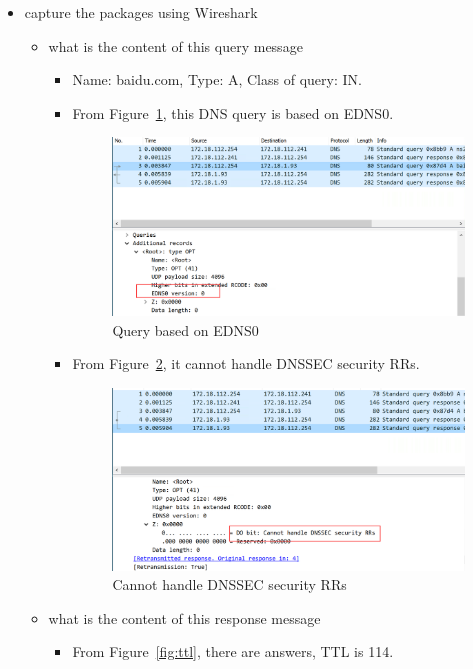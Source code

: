 \documentclass[12pt,letterpaper]{ctexart}
\begin{document}
\begin{itemize}
  \item capture the packages using Wireshark
  \begin{itemize}
    \item what is the content of this query message
    \begin{itemize}
      \item Name: baidu.com, Type: A, Class of query: IN.
      \item From Figure~\ref{fig:edns0}, this DNS query is based on EDNS0.
      \begin{figure}[H]
        \centering
        \includegraphics[width=0.8\linewidth]{assets/edns0.png}
        \caption{Query based on EDNS0}
        \label{fig:edns0}
      \end{figure}
      \item From Figure~\ref{fig:secure}, it cannot handle DNSSEC security RRs.
      \begin{figure}[H]
        \centering
        \includegraphics[width=0.8\linewidth]{assets/secure.png}
        \caption{Cannot handle DNSSEC security RRs}
        \label{fig:secure}
      \end{figure}
    \end{itemize}
    \item what is the content of this response message
    \begin{itemize}
      \item From Figure~\ref{fig:ttl}, there are answers, TTL is 114.

\end{itemize}
\end{itemize}
\end{itemize}
\end{document}
